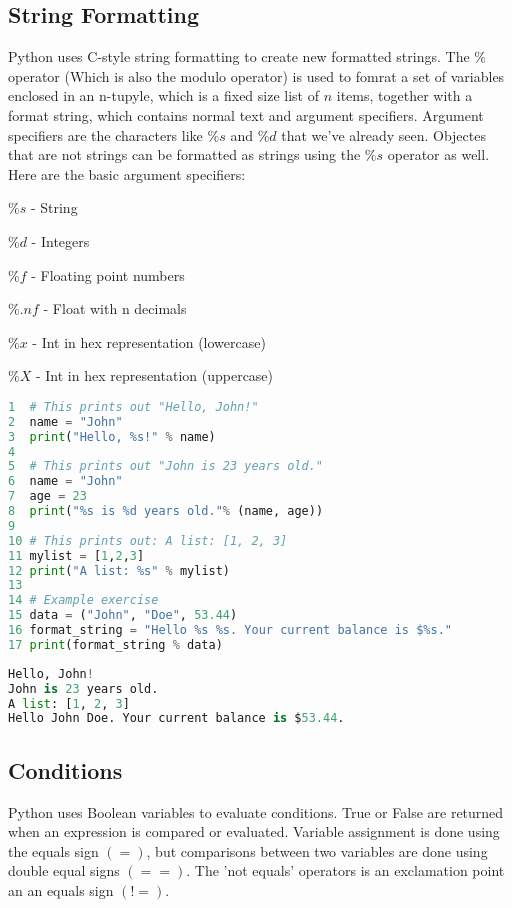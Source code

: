\documentclass[crop=false,class=book]{standalone}
\begin{document}
\subsection{String Formatting}
Python uses C-style string formatting to create new formatted strings. The $\%$ operator (Which is also the modulo operator) is used to fomrat a set of variables enclosed in an n-tupyle, which is a fixed size list of $n$ items, together with a format string, which contains normal text and argument specifiers. Argument specifiers are the characters like $\%s$ and $\%d$ that we've already seen. Objectes that are not strings can be formatted as strings using the $\%s$ operator as well. Here are the basic argument specifiers:
\begin{itemize}
    \begin{multicols}{2}
        \item $\%s$ - String
        \item $\%d$ - Integers
        \item $\%f$ - Floating point numbers
        \item $\%.nf$ - Float with n decimals
        \item $\%x$ - Int in hex representation (lowercase)
        \item $\%X$ - Int in hex representation (uppercase)
    \end{multicols}
\end{itemize}
\begin{lstlisting}[language=python,frame=single,basicstyle=\footnotesize,frame=single,caption=input]
1  # This prints out "Hello, John!"
2  name = "John"
3  print("Hello, %s!" % name)
4
5  # This prints out "John is 23 years old."
6  name = "John"
7  age = 23
8  print("%s is %d years old."% (name, age))
9
10 # This prints out: A list: [1, 2, 3]
11 mylist = [1,2,3]
12 print("A list: %s" % mylist)
13
14 # Example exercise
15 data = ("John", "Doe", 53.44)
16 format_string = "Hello %s %s. Your current balance is $%s."
17 print(format_string % data)
\end{lstlisting}
\begin{lstlisting}[language=python,frame=single,basicstyle=\footnotesize,frame=single,caption=output]
Hello, John!
John is 23 years old.
A list: [1, 2, 3]
Hello John Doe. Your current balance is $53.44.
\end{lstlisting}

\subsection{Conditions}
Python uses Boolean variables to evaluate conditions. True or False are returned when an expression is compared or evaluated. Variable assignment is done using the equals sign $(=)$, but comparisons between two variables are done using double equal signs $(==)$. The 'not equals' operators is an exclamation point an an equals sign $(!=)$.
\end{document}
